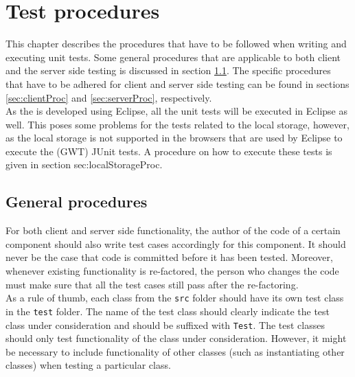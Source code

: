 \chapter{Test procedures}\label{chap:testProc}
This chapter describes the procedures that have to be followed when writing and executing unit tests. Some general procedures that are applicable to both client and the server side testing is discussed in section \ref{sec:genProc}. The specific procedures that have to be adhered for client and server side testing can be found in sections \ref{sec:clientProc} and \ref{sec:serverProc}, respectively. \\
As the \applicationname{} is developed using Eclipse, all the unit tests will be executed in Eclipse as well. This poses some problems for the tests related to the local storage, however, as the local storage is not supported in the browsers that are used by Eclipse to execute the (GWT) JUnit tests. A procedure on how to execute these tests is given in section {sec:localStorageProc}.

\section{General procedures}\label{sec:genProc}
For both client and server side functionality, the author of the code of a certain component should also write test cases accordingly for this component. It should never be the case that code is committed before it has been tested. Moreover, whenever existing functionality is re-factored, the person who changes the code must make sure that all the test cases still pass after the re-factoring. \\
As a rule of thumb, each class from the \texttt{src} folder should have its own test class in the \texttt{test} folder. The name of the test class should clearly indicate the test class under consideration and should be suffixed with \texttt{Test}. The test classes should only test functionality of the class under consideration. However, it might be necessary to include functionality of other classes (such as instantiating other classes) when testing a particular class.

